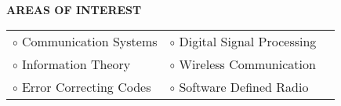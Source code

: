 \documentclass[a4paper,10pt]{article}
\begin{document}
{\qquad \\ \\ \\ \\ \\ \\ \\ \\ \\ \\ \\ \\ \\}





\colorbox{titleColor}{\parbox{6.5in}{\textbf{AREAS OF INTEREST}}}

%

 \begin{tabular}{p{3.5in}p{5in}p{3.5in}}
    $\circ$ Communication Systems        &$\circ$ Digital Signal Processing \\
    $\circ$ Information Theory       	  &$\circ$ Wireless Communication \\
    $\circ$ Error Correcting Codes	  &$\circ$ Software Defined Radio \\
  \end{tabular}
\end{document}
